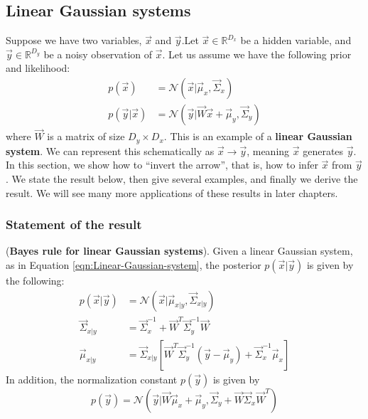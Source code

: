 \begin{refsection}
\begin{lemma}
\end{lemma}










\subsection{Linear Gaussian systems}
Suppose we have two variables, $\vec{x}$ and $\vec{y}$.Let $\vec{x} \in \mathbb{R}^{D_x}$ be a hidden variable, and $\vec{y} \in \mathbb{R}^{D_y}$ be a noisy observation of $\vec{x}$. Let us assume we have the following prior and likelihood:
\begin{equation}\label{eqn:Linear-Gaussian-system}
\boxed{\begin{split}
	p(\vec{x})&=\mathcal{N}(\vec{x}|\vec{\mu}_x,\vec{\Sigma}_x) \\
	p(\vec{y}|\vec{x})&=\mathcal{N}(\vec{y}|\vec{W}\vec{x}+\vec{\mu}_y,\vec{\Sigma}_y)
	\end{split}}
\end{equation}
where $\vec{W}$ is a matrix of size $D_y \times D_x$. This is an example of a \textbf{linear Gaussian system}. We can represent this schematically as $\vec{x} \rightarrow \vec{y}$, meaning $\vec{x}$ generates $\vec{y}$. In this section, we show how to “invert the arrow”, that is, how to infer $\vec{x}$ from $\vec{y}$. We state the result below, then give several examples, and finally we derive the result. We will see many more applications of these results in later chapters.


\subsubsection{Statement of the result}
\begin{theorem}(\textbf{Bayes rule for linear Gaussian systems}). 
	Given a linear Gaussian system, as in Equation \ref{eqn:Linear-Gaussian-system}, the posterior $p(\vec{x}|\vec{y})$ is given by the following:
	\begin{equation}\label{eqn:Linear-Gaussian-system-posterior}
	\boxed{\begin{split}
		p(\vec{x}|\vec{y})&=\mathcal{N}(\vec{x}|\vec{\mu}_{x|y},\vec{\Sigma}_{x|y}) \\
		\vec{\Sigma}_{x|y}&=\vec{\Sigma}_x^{-1}+\vec{W}^T\vec{\Sigma}_y^{-1}\vec{W} \\
		\vec{\mu}_{x|y}&=\vec{\Sigma}_{x|y}\left[\vec{W}^T\vec{\Sigma}_y^{-1}(\vec{y}-\vec{\mu}_y)+\vec{\Sigma}_x^{-1}\vec{\mu}_x\right]
		\end{split}}
	\end{equation}
	In addition, the normalization constant $p(\vec{y})$ is given by
	\begin{equation}\label{eqn:Linear-Gaussian-system-normalizer}
	\boxed{
		p(\vec{y})=\mathcal{N}(\vec{y}|\vec{W}\vec{\mu}_x+\vec{\mu}_y,\vec{\Sigma}_y+\vec{W}\vec{\Sigma}_x\vec{W}^T)
	}
	\end{equation}
\end{theorem}


\end{refsection}
